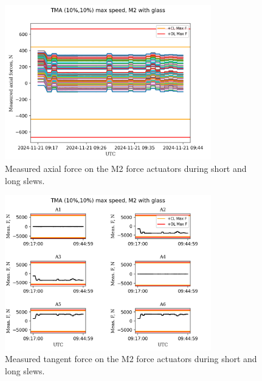 \begin{figure}
    \centering
    \includegraphics[width=0.8\textwidth]{spa/M2_short_long_slews_axial_measured_force_10.png}
    \caption{Measured axial force on the M2 force actuators during short and long slews.}
    \label{fig:m2_short_long_slews_axial}
    \end{figure}

\begin{figure}
    \centering
    \includegraphics[width=0.8\textwidth]{spa/M2_short_long_slews_Tangent_measured_forces_TMA_10.png}
    \caption{Measured tangent force on the M2 force actuators during short and long slews.}
    \label{fig:m2_short_long_slews_tangent}
    \end{figure}

